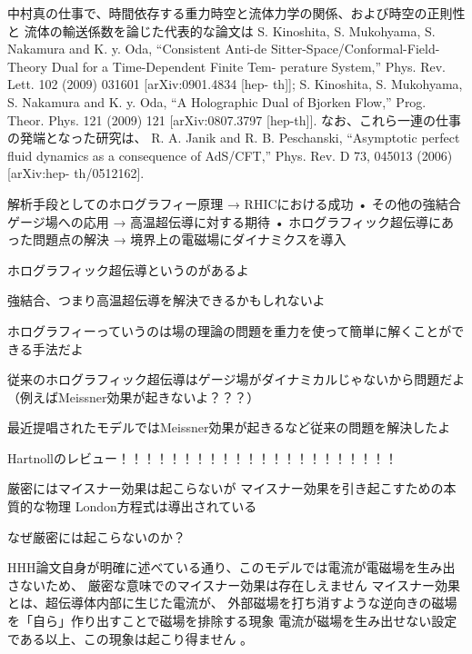 \documentclass[b5paper,11pt,dvipdfmx]{jsarticle}
\numberwithin{equation}{section}
\theoremstyle{definition}
\begin{document}
中村真の仕事で、時間依存する重力時空と流体力学の関係、および時空の正則性と
流体の輸送係数を論じた代表的な論文は
S. Kinoshita, S. Mukohyama, S. Nakamura and K. y. Oda, “Consistent Anti-de
Sitter-Space/Conformal-Field-Theory Dual for a Time-Dependent Finite Tem-
perature System,” Phys. Rev. Lett. 102 (2009) 031601 [arXiv:0901.4834 [hep-
th]];
S. Kinoshita, S. Mukohyama, S. Nakamura and K. y. Oda, “A Holographic
Dual of Bjorken Flow,” Prog. Theor. Phys. 121 (2009) 121 [arXiv:0807.3797
[hep-th]].
なお、これら一連の仕事の発端となった研究は、
R. A. Janik and R. B. Peschanski, “Asymptotic perfect fluid dynamics as
a consequence of AdS/CFT,” Phys. Rev. D 73, 045013 (2006) [arXiv:hep-
th/0512162].




解析手段としてのホログラフィー原理
→ RHICにおける成功
• その他の強結合ゲージ場への応用
→ 高温超伝導に対する期待
• ホログラフィック超伝導にあった問題点の解決
→ 境界上の電磁場にダイナミクスを導入



ホログラフィック超伝導というのがあるよ

強結合、つまり高温超伝導を解決できるかもしれないよ

ホログラフィーっていうのは場の理論の問題を重力を使って簡単に解くことができる手法だよ

従来のホログラフィック超伝導はゲージ場がダイナミカルじゃないから問題だよ
（例えばMeissner効果が起きないよ？？？）

最近提唱されたモデルではMeissner効果が起きるなど従来の問題を解決したよ




















\clearpage


Hartnollのレビュー！！！！！！！！！！！！！！！！！！！！！！

厳密にはマイスナー効果は起こらないが
マイスナー効果を引き起こすための本質的な物理
London方程式は導出されている

なぜ厳密には起こらないのか？

HHH論文自身が明確に述べている通り、このモデルでは電流が電磁場を生み出さないため、
厳密な意味でのマイスナー効果は存在しえません
マイスナー効果とは、超伝導体内部に生じた電流が、
外部磁場を打ち消すような逆向きの磁場を「自ら」作り出すことで磁場を排除する現象
電流が磁場を生み出せない設定である以上、この現象は起こり得ません 。
\end{document}
